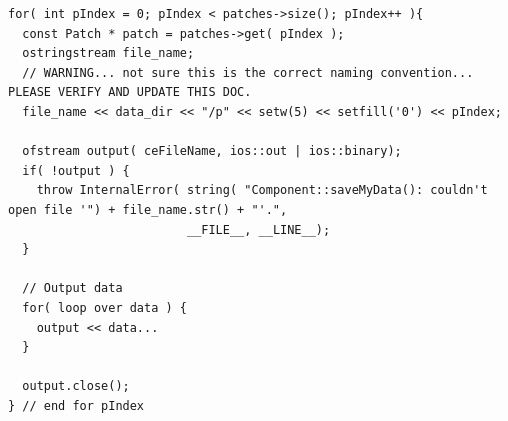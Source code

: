 \documentclass[12pt]{report}
\begin{document}
\begin{itemize}
\begin{Verbatim}
for( int pIndex = 0; pIndex < patches->size(); pIndex++ ){
  const Patch * patch = patches->get( pIndex );
  ostringstream file_name;
  // WARNING... not sure this is the correct naming convention... PLEASE VERIFY AND UPDATE THIS DOC.
  file_name << data_dir << "/p" << setw(5) << setfill('0') << pIndex;

  ofstream output( ceFileName, ios::out | ios::binary);
  if( !output ) {
    throw InternalError( string( "Component::saveMyData(): couldn't open file '") + file_name.str() + "'.",
                         __FILE__, __LINE__);        
  }

  // Output data
  for( loop over data ) {
    output << data...
  }

  output.close();
} // end for pIndex
\end{Verbatim}

\end{itemize}
\end{document}
